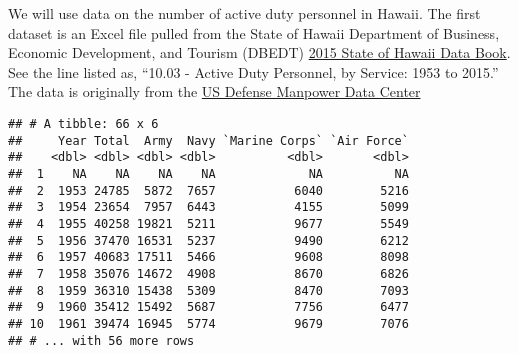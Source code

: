 \documentclass[]{book}
\newenvironment{Shaded}{\begin{snugshade}}{\end{snugshade}}
\newcommand{\KeywordTok}[1]{\textcolor[rgb]{0.13,0.29,0.53}{\textbf{{#1}}}}
\newcommand{\DataTypeTok}[1]{\textcolor[rgb]{0.13,0.29,0.53}{{#1}}}
\newcommand{\DecValTok}[1]{\textcolor[rgb]{0.00,0.00,0.81}{{#1}}}
\newcommand{\StringTok}[1]{\textcolor[rgb]{0.31,0.60,0.02}{{#1}}}
\newcommand{\OtherTok}[1]{\textcolor[rgb]{0.56,0.35,0.01}{{#1}}}
\newcommand{\NormalTok}[1]{{#1}}
\theoremstyle{definition}
\theoremstyle{definition}
\theoremstyle{remark}
\begin{document}
We will use data on the number of active duty personnel in Hawaii. The
first dataset is an Excel file pulled from the State of Hawaii
Department of Business, Economic Development, and Tourism (DBEDT)
\href{http://dbedt.hawaii.gov/economic/databook/2015-individual/}{2015
State of Hawaii Data Book}. See the line listed as, ``10.03 - Active
Duty Personnel, by Service: 1953 to 2015.'' The data is originally from
the \href{www.dmdc.osd.mil/appj/dwp/stats_reports.jsp}{US Defense
Manpower Data Center}

\begin{Shaded}
\end{Shaded}

\begin{verbatim}
## # A tibble: 66 x 6
##     Year Total  Army  Navy `Marine Corps` `Air Force`
##    <dbl> <dbl> <dbl> <dbl>          <dbl>       <dbl>
##  1    NA    NA    NA    NA             NA          NA
##  2  1953 24785  5872  7657           6040        5216
##  3  1954 23654  7957  6443           4155        5099
##  4  1955 40258 19821  5211           9677        5549
##  5  1956 37470 16531  5237           9490        6212
##  6  1957 40683 17511  5466           9608        8098
##  7  1958 35076 14672  4908           8670        6826
##  8  1959 36310 15438  5309           8470        7093
##  9  1960 35412 15492  5687           7756        6477
## 10  1961 39474 16945  5774           9679        7076
## # ... with 56 more rows
\end{verbatim}
\end{document}
